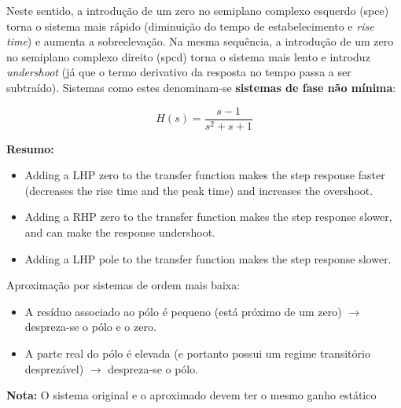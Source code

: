\vspace{1 em}
\noindent Neste sentido, a introdução de um zero no semiplano complexo esquerdo (spce) torna o sistema mais rápido (diminuição do tempo de estabelecimento e \textit{rise time}) e aumenta a sobreelevação. Na mesma sequência, a introdução de um zero no semiplano complexo direito (spcd) torna o sistema mais lento e introduz \textit{undershoot} (já que o termo derivativo da resposta no tempo passa a ser subtraído). Sistemas como estes denominam-se \textbf{sistemas de fase não mínima}:

$$
    H(s) = \dfrac{s - 1}{s^2 + s + 1} 
$$

\newpage
{

\begin{mdframed}
    \noindent\textbf{Resumo:}
    \begin{itemize}
        \item Adding a LHP zero to the transfer function makes the step response faster (decreases the rise time
and the peak time) and increases the overshoot.
        \item Adding a RHP zero to the transfer function makes the step response slower, and can make the
response undershoot.
        \item Adding a LHP pole to the transfer function makes the step response slower.
    \end{itemize}

    \noindent Aproximação por sistemas de ordem mais baixa:
    \begin{itemize}
        \item A resíduo associado ao pólo é pequeno (está próximo de um zero) $\rightarrow$ despreza-se o pólo e o zero.
        \item A parte real do pólo é elevada (e portanto possui um regime transitório desprezável) $\rightarrow$ despreza-se o pólo.
    \end{itemize}

    \noindent\textbf{Nota:} O sistema original e o aproximado devem ter o mesmo ganho estático
\end{mdframed}
}

